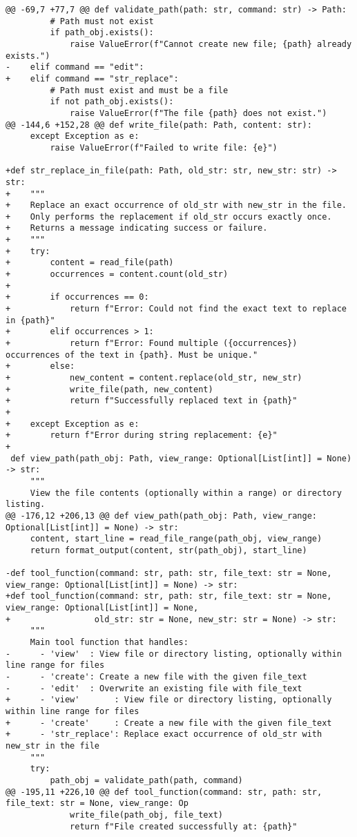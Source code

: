 \begin{lstlisting}[style=diffstyle]
@@ -69,7 +77,7 @@ def validate_path(path: str, command: str) -> Path:
         # Path must not exist
         if path_obj.exists():
             raise ValueError(f"Cannot create new file; {path} already exists.")
-    elif command == "edit":
+    elif command == "str_replace":
         # Path must exist and must be a file
         if not path_obj.exists():
             raise ValueError(f"The file {path} does not exist.")
@@ -144,6 +152,28 @@ def write_file(path: Path, content: str):
     except Exception as e:
         raise ValueError(f"Failed to write file: {e}")
 
+def str_replace_in_file(path: Path, old_str: str, new_str: str) -> str:
+    """
+    Replace an exact occurrence of old_str with new_str in the file.
+    Only performs the replacement if old_str occurs exactly once.
+    Returns a message indicating success or failure.
+    """
+    try:
+        content = read_file(path)
+        occurrences = content.count(old_str)
+        
+        if occurrences == 0:
+            return f"Error: Could not find the exact text to replace in {path}"
+        elif occurrences > 1:
+            return f"Error: Found multiple ({occurrences}) occurrences of the text in {path}. Must be unique."
+        else:
+            new_content = content.replace(old_str, new_str)
+            write_file(path, new_content)
+            return f"Successfully replaced text in {path}"
+            
+    except Exception as e:
+        return f"Error during string replacement: {e}"
+
 def view_path(path_obj: Path, view_range: Optional[List[int]] = None) -> str:
     """
     View the file contents (optionally within a range) or directory listing.
@@ -176,12 +206,13 @@ def view_path(path_obj: Path, view_range: Optional[List[int]] = None) -> str:
     content, start_line = read_file_range(path_obj, view_range)
     return format_output(content, str(path_obj), start_line)
 
-def tool_function(command: str, path: str, file_text: str = None, view_range: Optional[List[int]] = None) -> str:
+def tool_function(command: str, path: str, file_text: str = None, view_range: Optional[List[int]] = None,
+                 old_str: str = None, new_str: str = None) -> str:
     """
     Main tool function that handles:
-      - 'view'  : View file or directory listing, optionally within line range for files
-      - 'create': Create a new file with the given file_text
-      - 'edit'  : Overwrite an existing file with file_text
+      - 'view'       : View file or directory listing, optionally within line range for files
+      - 'create'     : Create a new file with the given file_text
+      - 'str_replace': Replace exact occurrence of old_str with new_str in the file
     """
     try:
         path_obj = validate_path(path, command)
@@ -195,11 +226,10 @@ def tool_function(command: str, path: str, file_text: str = None, view_range: Op
             write_file(path_obj, file_text)
             return f"File created successfully at: {path}"
 

\end{lstlisting}
